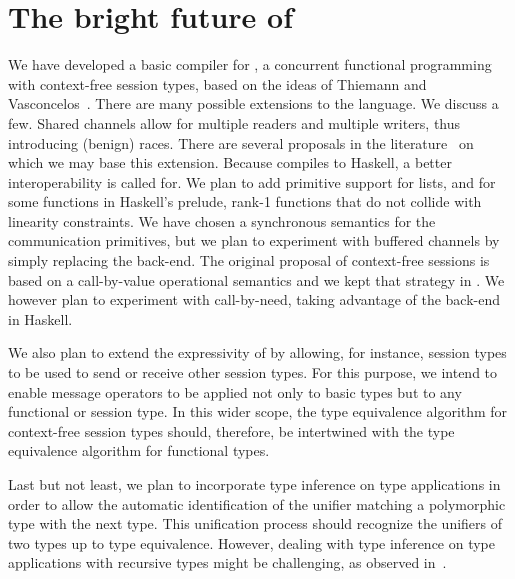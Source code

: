 \section{The bright future of \freest{}}
\label{sec:conclusion}

We have developed a basic compiler for \freest, a concurrent
functional programming with context-free session types, based on the
ideas of Thiemann and Vasconcelos~\cite{DBLP:conf/icfp/ThiemannV16}.
%
There are many possible extensions to the language. We discuss a
few. Shared channels allow for multiple readers and multiple writers,
thus introducing (benign) races. There are several proposals in the
literature~\cite{DBLP:journals/pacmpl/BalzerP17,
  DBLP:conf/sefm/FrancoV13,Lindley.Morris_Lightweight.functional.session.types,DBLP:journals/iandc/Vasconcelos12}
on which we may base this extension.
%
Because \freest{} compiles to Haskell, a better interoperability is
called for. We plan to add primitive support for lists, and for some
functions in Haskell's prelude, rank-1 functions that do not collide
with linearity constraints.
%
We have chosen a synchronous semantics for the communication
primitives, but we plan to experiment with buffered channels by simply
replacing the back-end.
%
The original proposal of context-free sessions is based on a
call-by-value operational semantics and we kept that strategy in
\freest. We however plan to experiment with call-by-need, taking
advantage of the back-end in Haskell. 

We also plan to extend the expressivity of \freest{}
by allowing, for instance, session types to be used to 
send or receive other session types. 
For this purpose, we intend to enable 
message operators to be applied not only to basic
types but to any functional or session type.
In this wider scope, 
the type equivalence algorithm for context-free session 
types should, therefore, be intertwined with the type equivalence
algorithm for functional types.

Last but not least, we plan to incorporate type inference on type 
applications in order to allow the automatic identification of the
unifier matching a polymorphic type with the next type. This 
unification process should recognize the unifiers of two types 
up to type equivalence. However,
dealing with type inference on type
applications with recursive types might be challenging, as observed 
in~\cite{hosoya1999good}.

